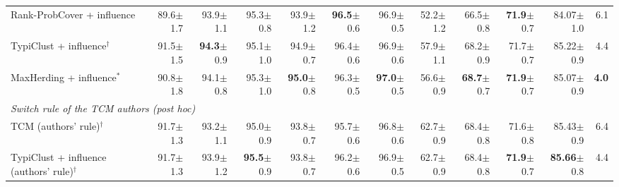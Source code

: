 \begin{table}[t]
\begin{adjustbox}{max width=\textwidth}
\begin{tabular}{lrrrrrrrrrrr}
\quad Rank-ProbCover + influence & 89.6{\scriptsize$\pm$1.7} & 93.9{\scriptsize$\pm$1.1} & 95.3{\scriptsize$\pm$0.8} & 93.9{\scriptsize$\pm$1.2} & \textbf{96.5}{\scriptsize$\pm$0.6} & 96.9{\scriptsize$\pm$0.5} & 52.2{\scriptsize$\pm$1.2} & 66.5{\scriptsize$\pm$0.8} & \textbf{71.9}{\scriptsize$\pm$0.7} & 84.07{\scriptsize$\pm$1.0} & 6.1 \\
\quad TypiClust + influence$^{\dagger}$ & 91.5{\scriptsize$\pm$1.5} & \textbf{94.3}{\scriptsize$\pm$0.9} & 95.1{\scriptsize$\pm$1.0} & 94.9{\scriptsize$\pm$0.7} & 96.4{\scriptsize$\pm$0.6} & 96.9{\scriptsize$\pm$0.6} & 57.9{\scriptsize$\pm$1.1} & 68.2{\scriptsize$\pm$0.9} & 71.7{\scriptsize$\pm$0.7} & 85.22{\scriptsize$\pm$0.9} & 4.4 \\
\quad MaxHerding + influence$^{*}$ & 90.8{\scriptsize$\pm$1.8} & 94.1{\scriptsize$\pm$0.8} & 95.3{\scriptsize$\pm$1.0} & \textbf{95.0}{\scriptsize$\pm$0.8} & 96.3{\scriptsize$\pm$0.5} & \textbf{97.0}{\scriptsize$\pm$0.5} & 56.6{\scriptsize$\pm$0.9} & \textbf{68.7}{\scriptsize$\pm$0.7} & \textbf{71.9}{\scriptsize$\pm$0.7} & 85.07{\scriptsize$\pm$0.9} & \textbf{4.0} \\
\multicolumn{12}{l}{\textit{Switch rule of the TCM authors (post hoc)}} \\
\quad TCM (authors' rule)$^{\dagger}$~\cite{doucet2024bridging} & 91.7{\scriptsize$\pm$1.3} & 93.2{\scriptsize$\pm$1.1} & 95.0{\scriptsize$\pm$0.9} & 93.8{\scriptsize$\pm$0.7} & 95.7{\scriptsize$\pm$0.6} & 96.8{\scriptsize$\pm$0.6} & 62.7{\scriptsize$\pm$0.9} & 68.4{\scriptsize$\pm$0.8} & 71.6{\scriptsize$\pm$0.8} & 85.43{\scriptsize$\pm$0.9} & 6.4 \\
\quad TypiClust + influence (authors' rule)$^{\dagger}$ & 91.7{\scriptsize$\pm$1.3} & 93.9{\scriptsize$\pm$1.2} & \textbf{95.5}{\scriptsize$\pm$0.9} & 93.8{\scriptsize$\pm$0.7} & 96.2{\scriptsize$\pm$0.6} & 96.9{\scriptsize$\pm$0.5} & 62.7{\scriptsize$\pm$0.9} & 68.4{\scriptsize$\pm$0.8} & \textbf{71.9}{\scriptsize$\pm$0.7} & \textbf{85.66}{\scriptsize$\pm$0.8} & 4.4 \\
\bottomrule
\end{tabular}
\end{adjustbox}
\end{table}
